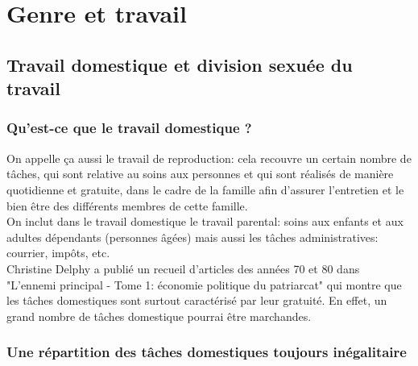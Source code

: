 \documentclass[10pt, a4paper, openany]{book}
\begin{document}
\chapter{Genre et travail}

\section{Travail domestique et division sexuée du travail}

\subsection{Qu'est-ce que le travail domestique ?}

On appelle ça aussi le travail de reproduction: cela recouvre un certain nombre de tâches, qui sont relative au soins aux personnes et qui sont réalisés de manière quotidienne et gratuite, dans le cadre de la famille afin d'assurer l'entretien et le bien être des différents membres de cette famille. \\
On inclut dans le travail domestique le travail parental: soins aux enfants et aux adultes dépendants (personnes âgées) mais aussi les tâches administratives: courrier, impôts, etc. \\
Christine Delphy a publié un recueil d'articles des années 70 et 80 dans "L'ennemi principal - Tome 1: économie politique du patriarcat" qui montre que les tâches domestiques sont surtout caractérisé par leur gratuité. En effet, un grand nombre de tâches domestique pourrai être marchandes.


\subsection{Une répartition des tâches domestiques toujours inégalitaire}
\end{document}
